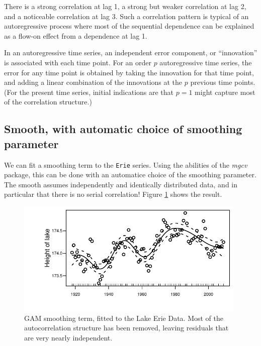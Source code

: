 \documentclass{tufte-book}\usepackage[]{graphicx}\usepackage[]{color}
\newcommand{\txtt}[1]{\texttt{#1}}
\begin{document}
There is a strong correlation at lag 1, a strong but weaker
correlation at lag 2, and a noticeable correlation at lag 3.  Such a
correlation pattern is typical of an autoregressive process where
most of the sequential dependence can be explained as a flow-on
effect from a dependence at lag 1.

In an autoregressive time series, an  independent error component, or ``innovation'' is
associated with each time point. For an order $p$ autoregressive time
series, the error for any time point is obtained by taking the
innovation for that time point, and adding a linear combination of the
innovations at the $p$ previous time points.  (For the present time
series, initial indications are that $p=1$ might capture most of the
correlation structure.)

\subsection*{Smooth, with automatic choice of smoothing parameter}

We can fit a smoothing term to the \txtt{Erie} series.  Using the
abilities of the {\em mgcv} package, this can be done with an
automatice choice of the smoothing parameter.  The smooth
assumes  independently and
identically distributed data, and in particular that there is no
serial correlation!  Figure \ref{lh-smoothplot} shows the result.

\begin{figure}
\begin{Schunk}


\centerline{\includegraphics[width=0.98\textwidth]{figs/12-gamErie-1} }

\end{Schunk}
\caption{GAM smoothing term, fitted to the Lake Erie Data.
    Most of the autocorrelation structure has been
    removed, leaving residuals that are very nearly independent.
  }\label{lh-smoothplot}
\end{figure}
\end{document}
